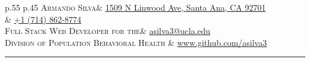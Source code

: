 \documentclass{Resume_Latex_Class}
\begin{document}
\begin{table}[htbp]
\begin{tabular}{ 
	p{}%
	p{}%
 }
	{\scshape\fontsize{20}{26}\mdseries\upshape Armando Silva}& \centering\arraybackslash \href{https://www.google.com/maps/place/1509+N+Linwood+Ave,+Santa+Ana,+CA+92701/@33.758298,-117.8506497,17z/data=!3m1!4b1!4m5!3m4!1s0x80dcd99c21dd18dd:0x4fe5fb4a40877585!8m2!3d33.758298!4d-117.848461}{1509 N Linwood Ave, Santa Ana, CA 92701} \\ 
	& \centering\arraybackslash \href{tel:17148628774}{+1 (714) 862-8774}        \\ 

	{\scshape\fontsize{10}{10}\mdseries\upshape Full Stack Web Developer for the}& \centering\arraybackslash \href{mailto:asilva3@ucla.edu}{asilva3@ucla.edu}         \\ 
	{\scshape\fontsize{10}{10}\mdseries\upshape Division of Population Behavioral Health}
	& \centering\arraybackslash \href{http://www.github.com/asilva3}{www.github.com/asilva3} \\

\end{tabular}
\end{table}
\hrule
\end{document}
